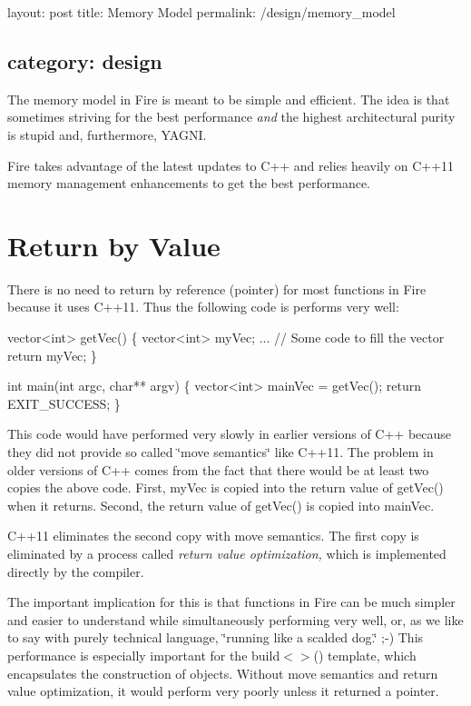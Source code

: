 

 layout\+: post title\+: Memory Model permalink\+: /design/memory\+\_\+model \subsection*{category\+: design }

The memory model in Fire is meant to be simple and efficient. The idea is that sometimes striving for the best performance {\itshape and} the highest architectural purity is stupid and, furthermore, Y\+A\+G\+NI.

Fire takes advantage of the latest updates to C++ and relies heavily on C++11 memory management enhancements to get the best performance.

\section*{Return by Value}

There is no need to return by reference (pointer) for most functions in Fire because it uses C++11. Thus the following code is performs very well\+:


\begin{DoxyCode}
vector<int> getVec() \{
    vector<int> myVec;
    ... \textcolor{comment}{// Some code to fill the vector}
    \textcolor{keywordflow}{return} myVec;
\}

\textcolor{keywordtype}{int} main(\textcolor{keywordtype}{int} argc, \textcolor{keywordtype}{char}** argv) \{
    vector<int> mainVec = getVec();
    \textcolor{keywordflow}{return} EXIT\_SUCCESS;
\}
\end{DoxyCode}


This code would have performed very slowly in earlier versions of C++ because they did not provide so called \char`\"{}move semantics\char`\"{} like C++11. The problem in older versions of C++ comes from the fact that there would be at least two copies the above code. First, my\+Vec is copied into the return value of get\+Vec() when it returns. Second, the return value of get\+Vec() is copied into main\+Vec.

C++11 eliminates the second copy with move semantics. The first copy is eliminated by a process called {\itshape return value optimization,} which is implemented directly by the compiler.

The important implication for this is that functions in Fire can be much simpler and easier to understand while simultaneously performing very well, or, as we like to say with purely technical language, \char`\"{}running like a scalded dog.\char`\"{} ;-\/) This performance is especially important for the build$<$$>$() template, which encapsulates the construction of objects. Without move semantics and return value optimization, it would perform very poorly unless it returned a pointer.

